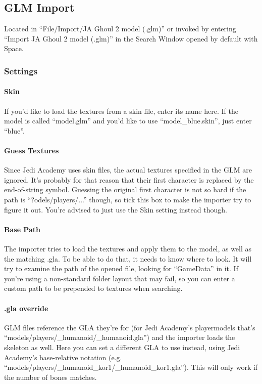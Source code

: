 \documentclass[a4paper,10pt]{article}
\begin{document}
 
 \subsection{GLM Import}
 
 Located in ``File/Import/JA Ghoul 2 model (.glm)'' or invoked by entering ``Import JA Ghoul 2 model (.glm)''
 in the Search Window opened by default with Space.
 
 \subsubsection*{Settings}
 
 \paragraph*{Skin}
 If you'd like to load the textures from a skin file, enter its name here. If the model is called ``model.glm''
 and you'd like to use ``model\_blue.skin'', just enter ``blue''.
 
 \paragraph*{Guess Textures}
 Since Jedi Academy uses skin files, the actual textures specified in the GLM are ignored. It's probably for
 that reason that their first character is replaced by the end-of-string symbol. Guessing the original first
 character is not so hard if the path is ``?odels/players/...'' though, so tick this box to make the importer
 try to figure it out. You're advised to just use the Skin setting instead though.
 
 \paragraph*{Base Path}
 The importer tries to load the textures and apply them to the model, as well as the matching .gla. To be able
 to do that, it needs to know where to look. It will try to examine the path of the opened file, looking for
 ``GameData'' in it. If you're using a non-standard folder layout that may fail, so you can enter a custom path
 to be prepended to textures when searching.
 
 \paragraph*{.gla override}
 GLM files reference the GLA they're for (for Jedi Academy's playermodels that's
 ``models/players/\_humanoid/\_humanoid.gla'') and the importer loads the skeleton as well. Here you can set
 a different GLA to use instead, using Jedi Academy's base-relative notation (e.g.\\
 ``models/players/\_humanoid\_kor1/\_humanoid\_kor1.gla''). This will only work if the number of bones matches.
 
\end{document}
